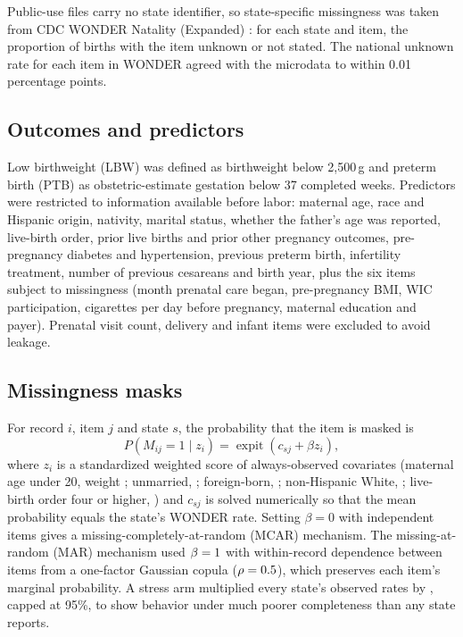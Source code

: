 \documentclass[11pt]{article}
\begin{document}
Public-use files carry no state identifier, so state-specific missingness was taken from CDC WONDER Natality (Expanded) \citep{wonder2026}: for each state and item, the proportion of \TestYear{} births with the item unknown or not stated. The national unknown rate for each item in WONDER agreed with the microdata to within 0.01 percentage points.

\subsection{Outcomes and predictors}

Low birthweight (LBW) was defined as birthweight below 2{,}500\,g and preterm birth (PTB) as obstetric-estimate gestation below 37 completed weeks. Predictors were restricted to information available before labor: maternal age, race and Hispanic origin, nativity, marital status, whether the father's age was reported, live-birth order, prior live births and prior other pregnancy outcomes, pre-pregnancy diabetes and hypertension, previous preterm birth, infertility treatment, number of previous cesareans and birth year, plus the six items subject to missingness (month prenatal care began, pre-pregnancy BMI, WIC participation, cigarettes per day before pregnancy, maternal education and payer). Prenatal visit count, delivery and infant items were excluded to avoid leakage.

\subsection{Missingness masks}

For record $i$, item $j$ and state $s$, the probability that the item is masked is
\begin{equation}
P(M_{ij}=1 \mid z_i) = \operatorname{expit}(c_{sj} + \beta z_i),
\end{equation}
where $z_i$ is a standardized weighted score of always-observed covariates (maternal age under 20, weight \WTeen; unmarried, \WUnmarried; foreign-born, \WForeignBorn; non-Hispanic White, \WNhWhite; live-birth order four or higher, \WHighParity) and $c_{sj}$ is solved numerically so that the mean probability equals the state's WONDER rate. Setting $\beta=0$ with independent items gives a missing-completely-at-random (MCAR) mechanism. The missing-at-random (MAR) mechanism used $\beta=1$ with within-record dependence between items from a one-factor Gaussian copula ($\rho=0.5$), which preserves each item's marginal probability. A stress arm multiplied every state's observed rates by \StressMult, capped at 95\%, to show behavior under much poorer completeness than any state reports.
\end{document}
